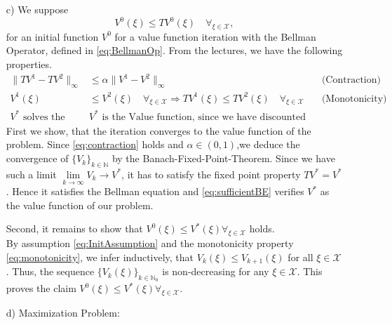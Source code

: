 \documentclass[]{article}
\newcommand{\norm}[1]{\parallel \! \! #1 \! \! \parallel}
\newcommand{\N}{\mathbb{N}}
\newcommand{\X}{\mathcal{X}}
\newcommand{\writeset}[1]{\{#1\}}
\newcommand{\Vk}{V_k}
\newcommand{\Vopt}{\Vind{*}}
\newcommand{\Vind}[1]{V^#1}
\newcommand{\Vone}{\Vind{1}}
\newcommand{\Vtwo}{\Vind{2}}
\newcommand{\Vnull}{\Vind{0}}
\newcommand{\Vkplus}{V_{k+1}}
\begin{document}
\begin{enumerate}
			
			\item[c)] We suppose
			\begin{equation}
				\Vnull(\xi) \leq T\Vnull(\xi) \quad \forall_{\xi \in \X} \label{eq:InitAssumption},
			\end{equation}
			for an initial function $ \Vnull $ for a value function iteration with the Bellman Operator, defined in \eqref{eq:BellmanOp}.
			From the lectures, we have the following properties.
			\begin{align}
				\norm{T\Vone - T\Vtwo}_\infty &\leq \alpha \norm{\Vone - \Vtwo}_\infty \quad &\text{(Contraction)} \label{eq:contraction}\\
				\Vone(\xi) &\leq \Vtwo(\xi) \quad \forall_{\xi \in \X} \Longrightarrow T\Vone(\xi) \leq T\Vtwo(\xi) \quad \forall_{\xi \in \X} \quad &\text{(Monotonicity)} \label{eq:monotonicity}\\
				\Vopt \text{ solves the Bellman Equation }&  \Vopt \text{ is the Value function, since we have discounted costs.} \label{eq:sufficientBE}
			\end{align}
			First we show, that the iteration converges to the value function of the problem. Since \eqref{eq:contraction} holds and   $ \alpha \in (0,1) $,we deduce the convergence of  $ \writeset{\Vk}_{k \in \N} $ by the Banach-Fixed-Point-Theorem. Since we have such a limit $ \lim\limits_{k \rightarrow \infty} \Vk \longrightarrow \Vopt $, it has to satisfy the fixed point property $ T\Vopt = \Vopt $. Hence it satisfies the Bellman equation and \eqref{eq:sufficientBE} verifies $ \Vopt $ as the value function of our problem.
			
			Second, it remains to show that $ \Vnull(\xi) \leq \Vopt(\xi) \forall_{\xi \in \X} $ holds.\\
			By assumption \eqref{eq:InitAssumption} and the monotonicity property \eqref{eq:monotonicity}, we infer inductively, that $ \Vk(\xi) \leq \Vkplus(\xi) $ for all $ \xi \in \X $. Thus, the sequence $ \writeset{\Vk(\xi)}_{k\in \N_0} $ is non-decreasing for any $ \xi \in \X $. This proves the claim $ \Vnull(\xi) \leq \Vopt(\xi) \forall_{\xi \in \X } $.
			
			\item[d)] Maximization Problem:
			

\end{enumerate}
\end{document}
